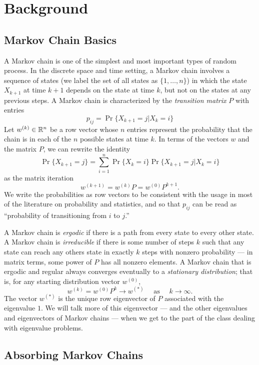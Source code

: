\documentclass[12pt, leqno]{article}
\begin{document}
\section*{Background}

\subsection*{Markov Chain Basics}

A Markov chain is one of the simplest and most important types of
random process.  In the discrete space and time setting, a Markov
chain involves a sequence of states (we label the set of all states as
$\{1, \ldots, n\}$) in which the state $X_{k+1}$ at time $k+1$ depends
on the state at time $k$, but not on the states at any previous steps.
A Markov chain is characterized by the {\em transition matrix}
$P$ with entries
\[
  p_{ij} = \operatorname{Pr}\{X_{k+1} = j | X_k = i\}
\]
Let $w^{(k)} \in \mathbb{R}^n$ be a row vector whose $n$ entries represent the
probability that the chain is in each of the $n$ possible states at
time $k$.  In terms of the vectors $w$ and the matrix $P$, we can
rewrite the identity
\[
  \operatorname{Pr}\{X_{k+1} = j\} =
  \sum_{i=1}^n \operatorname{Pr}\{X_k=i\} \operatorname{Pr}\{X_{k+1} = j | X_k = i\}
\]
as the matrix iteration
\[
  w^{(k+1)} = w^{(k)} P = w^{(0)} P^{k+1}.
\]
We write the probabilities as row vectors to be consistent with the
usage in most of the literature on probability and statistics, and so
that $p_{ij}$ can be read as ``probability of transitioning from $i$
to $j$.''

A Markov chain is {\em ergodic} if there is a path from every state to
every other state.  A Markov chain is {\em irreducible} if there is
some number of steps $k$ such that any state can reach any others
state in exactly $k$ steps with nonzero probability --- in matrix
terms, some power of $P$ has all nonzero elements.  A Markov chain
that is ergodic and regular always converges eventually to a {\em
  stationary distribution}; that is, for any starting distribution
vector $w^{(0)}$,
\[
w^{(k)} = w^{(0)} P^k \rightarrow w^{(*)}
\quad \mbox{ as } \quad k \rightarrow \infty.
\]
The vector $w^{(*)}$ is the unique row eigenvector of $P$ associated
with the eigenvalue $1$.  We will talk more of this eigenvector ---
and the other eigenvalues and eigenvectors of Markov chains --- when
we get to the part of the class dealing with eigenvalue problems.

\subsection*{Absorbing Markov Chains}
\end{document}
